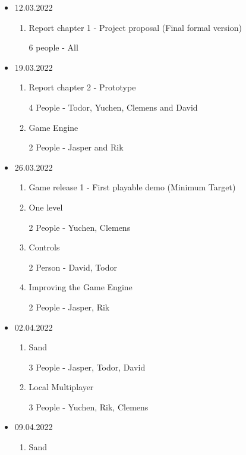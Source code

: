 \begin{itemize}
    \item 12.03.2022
    \begin{enumerate}
        \item Report chapter 1 - Project proposal (Final formal version)
        
        6 people - All
    \end{enumerate}
    
    \item 19.03.2022
    \begin{enumerate}
        \item Report chapter 2 - Prototype
        
        4 People - Todor, Yuchen, Clemens and David
        \item Game Engine
        
        2 People - Jasper and Rik
    \end{enumerate}
    
    \item 26.03.2022
    \begin{enumerate}
        \item Game release 1 - First playable demo (Minimum Target)
        \item One level
        
        2 People - Yuchen, Clemens
        
        \item Controls
        
        2 Person - David, Todor
        
        \item Improving the Game Engine
        
        2 People - Jasper, Rik
    \end{enumerate}
    
    \item 02.04.2022
    \begin{enumerate}
        \item Sand
        
        3 People - Jasper, Todor, David
        \item Local Multiplayer
        
        3 People - Yuchen, Rik, Clemens
    \end{enumerate}
    
    \item 09.04.2022
    \begin{enumerate}
        \item Sand
        

\end{enumerate}
\end{itemize}
